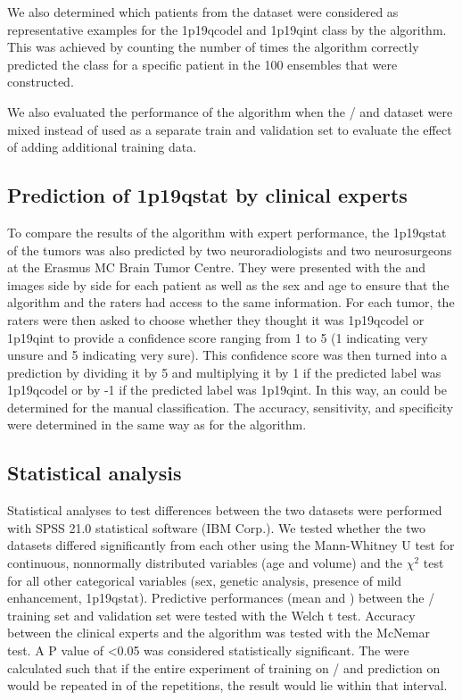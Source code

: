 We also determined which patients from the  dataset were considered as representative examples for the \acl{1p19qcodel} and \acl{1p19qint} class by the algorithm.
This was achieved by counting the number of times the algorithm correctly predicted the class for a specific patient in the 100 ensembles that were constructed.

We also evaluated the performance of the algorithm when the / and  dataset were mixed instead of used as a separate train and validation set to evaluate the effect of adding additional training data.
\subsection{Prediction of \acl{1p19qstat} by clinical experts}

To compare the results of the algorithm with expert performance, the \acl{1p19qstat} of the  tumors was also predicted by two neuroradiologists and two neurosurgeons at the Erasmus MC Brain Tumor Centre.
They were presented with the  and  images side by side for each patient as well as the sex and age to ensure that the algorithm and the raters had access to the same information.
For each tumor, the raters were then asked to choose whether they thought it was \acl{1p19qcodel} or \acl{1p19qint} to provide a confidence score ranging from 1 to 5 (1 indicating very unsure and 5 indicating very sure).
This confidence score was then turned into a prediction  by dividing it by 5 and multiplying it by 1 if the predicted label was \acl{1p19qcodel} or by -1 if the predicted label was \acl{1p19qint}.
In this way, an  could be determined for the manual classification.
The accuracy, sensitivity, and specificity were determined in the same way as for the algorithm.

\subsection{Statistical analysis}

Statistical analyses to test differences between the two datasets were performed with SPSS \num{21.0} statistical software (IBM Corp.).
We tested whether the two datasets differed significantly from each other using the Mann-Whitney U test for continuous, nonnormally distributed variables (age and volume) and the $\chi^2$ test for all other categorical variables (sex, genetic analysis, presence of mild enhancement, \acl{1p19qstat}).
Predictive performances (mean and  ) between the / training set and  validation set were tested with the Welch t test.
Accuracy between the clinical experts and the algorithm was tested with the McNemar test.
A P value of \num{<0.05} was considered statistically significant.
The   were calculated such that if the entire experiment of training on / and prediction on  would be repeated in  of the repetitions, the result would lie within that interval.

